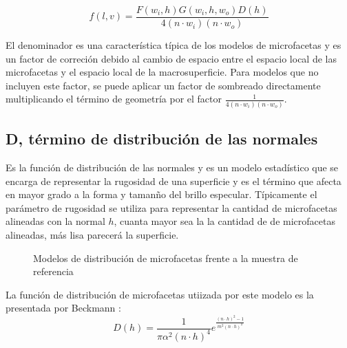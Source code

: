             \begin{equation}
                f(l, v) = \frac{F(w_i, h) G(w_i, h, w_o) D(h)} {4(n\cdot{w_i}) (n \cdot{w_o})}
            \end{equation}
            \singlespacing
            
            
            El denominador es una caracter\'istica t\'ipica de los modelos de microfacetas y es un factor de correci\'on
            debido al cambio de espacio entre el espacio local de las microfacetas y el espacio local de la macrosuperficie. Para modelos
            que no incluyen este factor, se puede aplicar un factor de sombreado directamente multiplicando el t\'ermino de geometr\'ia
            por el factor $\frac{1}{4(n\cdot{w_i}) (n\cdot{w_o})}$.\\

            \singlespacing
            \subsection*{D, t\'ermino de distribuci\'on de las normales}
            Es la funci\'on de distribuci\'on de las normales y es un modelo estad\'istico que se encarga de representar
            la rugosidad de una superficie y es el t\'ermino que afecta en mayor grado a la forma y taman\~no del brillo especular. T\'ipicamente el par\'ametro de
            rugosidad se utiliza para representar la cantidad de microfacetas alineadas con la normal $h$, cuanta mayor sea la
            la cantidad de de microfacetas alineadas, m\'as lisa parecer\'a la superficie.\\

            \begin{figure}[H]
                \vspace{0.5cm}
                \centering
                \caption{Modelos de distribuci\'on de microfacetas frente a la muestra de referencia}
                \vspace{0.5cm}
            \end{figure}

            La funci\'on de distribuci\'on de microfacetas utiizada por este modelo es la presentada por Beckmann \autocite{beckmann}:\\

            \begin{equation}
                D(h) =
                \frac{1}{\pi\alpha^2(n\cdot{h})^4}
                e^{
                    \frac
                    {(n\cdot{h})^2 - 1}
                    {m^2(n\cdot{h})^2}
                }
            \end{equation}
            \singlespacing

